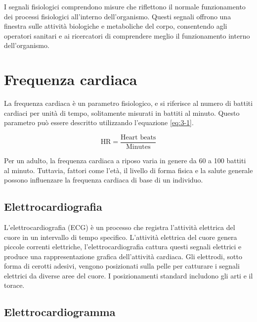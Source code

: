 \bigskip

I segnali fisiologici comprendono misure che riflettono il normale funzionamento dei processi fisiologici all'interno dell'organismo. Questi segnali offrono una finestra sulle attività biologiche e metaboliche del corpo, consentendo agli operatori sanitari e ai ricercatori di comprendere meglio il funzionamento interno dell'organismo.

\section{Frequenza cardiaca}

La frequenza cardiaca è un parametro fisiologico, e si riferisce al numero di battiti cardiaci per unità di tempo, solitamente misurati in battiti al minuto. Questo parametro può essere descritto utilizzando l'equazione \ref{eq:3-1}.

\begin{equation}
    \boxed{
    \text{HR} = \frac{\text{Heart beats}}{\text{Minutes}}
    }
    \label{eq:3-1}
\end{equation}

\bigskip

Per un adulto, la frequenza cardiaca a riposo varia in genere da 60 a 100 battiti al minuto. Tuttavia, fattori come l'età, il livello di forma fisica e la salute generale possono influenzare la frequenza cardiaca di base di un individuo.

\subsection{Elettrocardiografia}

L'elettrocardiografia (ECG) è un processo che registra l'attività elettrica del cuore in un intervallo di tempo specifico. L'attività elettrica del cuore genera piccole correnti elettriche, l'elettrocardiografia cattura questi segnali elettrici e produce una rappresentazione grafica dell'attività cardiaca. Gli elettrodi, sotto forma di cerotti adesivi, vengono posizionati sulla pelle per catturare i segnali elettrici da diverse aree del cuore. I posizionamenti standard includono gli arti e il torace.

\subsection{Elettrocardiogramma}

